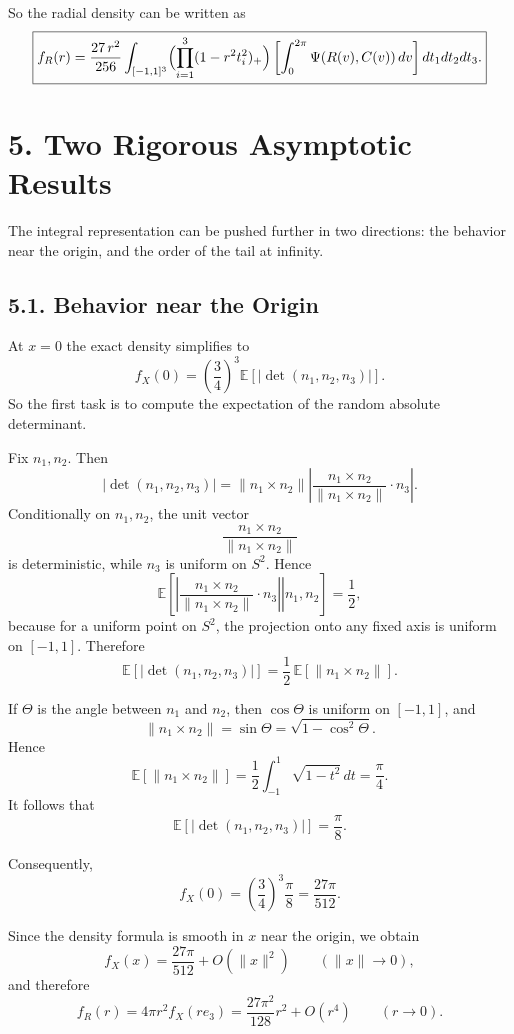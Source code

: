 \documentclass[11pt]{article}
\begin{document}
So the radial density can be written as
\[
\boxed{
f_R(r)
=
\frac{27\,r^2}{256}
\int_{[-1,1]^3}
\Bigl(\prod_{i=1}^3 (1-r^2 t_i^2)_+\Bigr)
\left[
\int_0^{2\pi}\Psi(R(v),C(v))\,dv
\right]
dt_1dt_2dt_3.
}
\]

\section*{5. Two Rigorous Asymptotic Results}

The integral representation can be pushed further in two directions: the behavior near the origin,
and the order of the tail at infinity.

\subsection*{5.1. Behavior near the Origin}

At $x=0$ the exact density simplifies to
\[
f_X(0)
=
\left(\frac{3}{4}\right)^3 \mathbb{E}\!\left[\left|\det(n_1,n_2,n_3)\right|\right].
\]
So the first task is to compute the expectation of the random absolute determinant.

Fix $n_1,n_2$. Then
\[
\left|\det(n_1,n_2,n_3)\right|
=
\|n_1\times n_2\|
\left|
\frac{n_1\times n_2}{\|n_1\times n_2\|}\cdot n_3
\right|.
\]
Conditionally on $n_1,n_2$, the unit vector
\[
\frac{n_1\times n_2}{\|n_1\times n_2\|}
\]
is deterministic, while $n_3$ is uniform on $S^2$. Hence
\[
\mathbb{E}\!\left[
\left.
\left|
\frac{n_1\times n_2}{\|n_1\times n_2\|}\cdot n_3
\right|
\right| n_1,n_2
\right]
=
\frac{1}{2},
\]
because for a uniform point on $S^2$, the projection onto any fixed axis is uniform on $[-1,1]$.
Therefore
\[
\mathbb{E}\!\left[\left|\det(n_1,n_2,n_3)\right|\right]
=
\frac{1}{2}\,\mathbb{E}\!\left[\|n_1\times n_2\|\right].
\]

If $\Theta$ is the angle between $n_1$ and $n_2$, then $\cos\Theta$ is uniform on $[-1,1]$, and
\[
\|n_1\times n_2\| = \sin\Theta = \sqrt{1-\cos^2\Theta}.
\]
Hence
\[
\mathbb{E}\!\left[\|n_1\times n_2\|\right]
=
\frac{1}{2}\int_{-1}^1 \sqrt{1-t^2}\,dt
=
\frac{\pi}{4}.
\]
It follows that
\[
\boxed{
\mathbb{E}\!\left[\left|\det(n_1,n_2,n_3)\right|\right] = \frac{\pi}{8}.
}
\]

Consequently,
\[
\boxed{
f_X(0)=\left(\frac{3}{4}\right)^3 \frac{\pi}{8}=\frac{27\pi}{512}.
}
\]

Since the density formula is smooth in $x$ near the origin, we obtain
\[
f_X(x)=\frac{27\pi}{512}+O(\|x\|^2)
\qquad (\|x\|\to 0),
\]
and therefore
\[
\boxed{
f_R(r)=4\pi r^2 f_X(re_3)
=
\frac{27\pi^2}{128}r^2+O(r^4)
\qquad (r\to 0).
}
\]
\end{document}
